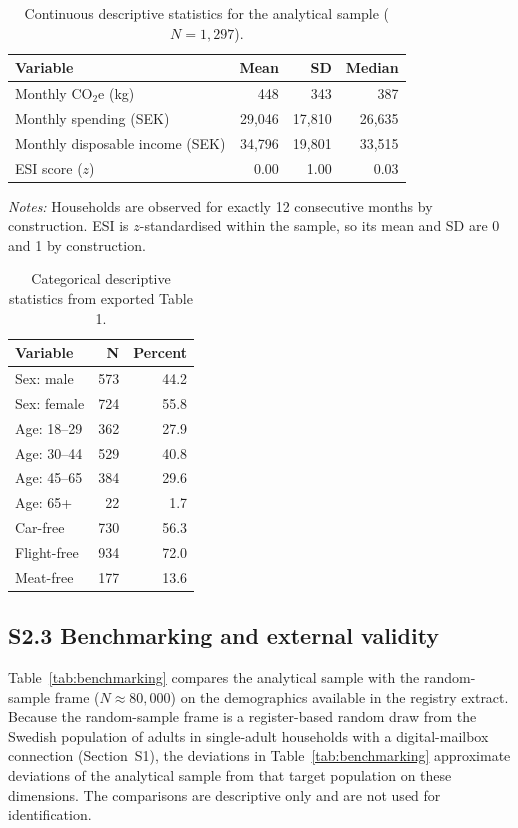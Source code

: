 \documentclass[12pt]{article}
\begin{document}
\begin{table}[!htbp]
\centering \small
\caption{Continuous descriptive statistics for the analytical sample ($N=1{,}297$).}
\label{tab:desc_cont}
\begin{tabular}{lrrr}
\toprule
\textbf{Variable} & \textbf{Mean} & \textbf{SD} & \textbf{Median} \\
\midrule
Monthly CO$_2$e (kg)            & 448     & 343     & 387 \\
Monthly spending (SEK)          & 29{,}046 & 17{,}810 & 26{,}635 \\
Monthly disposable income (SEK) & 34{,}796 & 19{,}801 & 33{,}515 \\
ESI score ($z$)                 & 0.00    & 1.00    & 0.03 \\
\bottomrule
\end{tabular}
\smallskip

{\footnotesize\raggedright
\textit{Notes:} Households are observed for exactly 12 consecutive months by construction. ESI is $z$-standardised within the sample, so its mean and SD are 0 and 1 by construction.\par}
\end{table}

\begin{table}[!htbp]
\centering
\small
\caption{Categorical descriptive statistics from exported Table 1.}
\label{tab:desc_cat}
\begin{tabular}{lrr}
\toprule
\textbf{Variable} & \textbf{N} & \textbf{Percent} \\
\midrule
Sex: male & 573 & 44.2 \\
Sex: female & 724 & 55.8 \\
Age: 18--29 & 362 & 27.9 \\
Age: 30--44 & 529 & 40.8 \\
Age: 45--65 & 384 & 29.6 \\
Age: 65+ & 22 & 1.7 \\
Car-free & 730 & 56.3 \\
Flight-free & 934 & 72.0 \\
Meat-free & 177 & 13.6 \\
\bottomrule
\end{tabular}
\end{table}

\subsection*{S2.3 Benchmarking and external validity}
Table~\ref{tab:benchmarking} compares the analytical sample with the
random-sample frame ($N\approx 80{,}000$) on the demographics available in the registry extract. Because the random-sample frame is a register-based random draw from the Swedish population of adults in single-adult households with a digital-mailbox connection (Section~S1), the deviations in Table~\ref{tab:benchmarking} approximate deviations of the analytical sample from that target population on these dimensions. The comparisons are descriptive only and are not used for identification.
\end{document}
